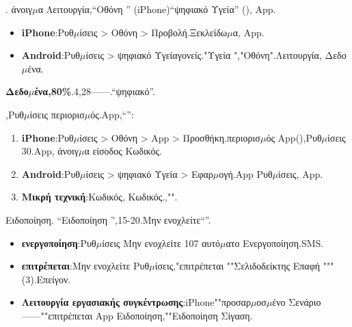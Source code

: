 


. άνοιγ$\mu$α Λειτουργία,“Οθόνη ” (iPhone)“ψηφιακό Υγεία” (), App.

\begin{itemize}
  \item \textbf{iPhone}:Ρυθ$\mu$ίσεις > Οθόνη > Προβολή.Ξεκλείδω$\mu$α, App.
  \item \textbf{Android}:Ρυθ$\mu$ίσεις > ψηφιακό Υγείαγονείς."Υγεία ","Οθόνη".Λειτουργία, Δεδο$\mu$ένα.
\end{itemize}

\textbf{Δεδο$\mu$ένα,80\%}.4,28——.“ψηφιακό”.


,Ρυθ$\mu$ίσεις περιορισ$\mu$ός.App,“”:

\begin{enumerate}
  \item \textbf{iPhone}:Ρυθ$\mu$ίσεις > Οθόνη > App > Προσθήκη.περιορισ$\mu$ός App(),Ρυθ$\mu$ίσεις 30.App, άνοιγ$\mu$α είσοδος Κωδικός.
  \item \textbf{Android}:Ρυθ$\mu$ίσεις > ψηφιακό Υγεία > Εφαρ$\mu$ογή.App Ρυθ$\mu$ίσεις, App.
  \item \textbf{Μικρή τεχνική}:Κωδικός, Κωδικός.,"".
\end{enumerate}


Ειδοποίηση. “Ειδοποίηση ”,15-20.Μην ενοχλείτε“”.

\begin{itemize}
  \item \textbf{ενεργοποίηση}:Ρυθ$\mu$ίσεις Μην ενοχλείτε 107 αυτό$\mu$ατο Ενεργοποίηση.SMS.
  \item \textbf{επιτρέπεται}:Μην ενοχλείτε Ρυθ$\mu$ίσεις,"επιτρέπεται ""Σελιδοδείκτης Επαφή """ (3).Επείγον.
  \item \textbf{Λειτουργία εργασιακής συγκέντρωσης}:iPhone""προσαρ$\mu$οσ$\mu$ένο Σενάριο——""επιτρέπεται App Ειδοποίηση,""Ειδοποίηση Σίγαση.
\end{itemize}


